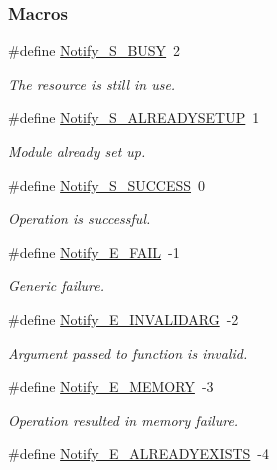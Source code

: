 \subsubsection*{Macros}
\begin{DoxyCompactItemize}
\item 
\#define \hyperlink{_notify_8h_a0d58ddfdb5d08f6ca1de749701033450}{Notify\-\_\-\-S\-\_\-\-B\-U\-S\-Y}~2
\begin{DoxyCompactList}\small\item\em The resource is still in use. \end{DoxyCompactList}\item 
\#define \hyperlink{_notify_8h_a4a3b8a694b528547f8478d0b9e24289c}{Notify\-\_\-\-S\-\_\-\-A\-L\-R\-E\-A\-D\-Y\-S\-E\-T\-U\-P}~1
\begin{DoxyCompactList}\small\item\em Module already set up. \end{DoxyCompactList}\item 
\#define \hyperlink{_notify_8h_a846ddddd026310bcbcda9837a3571ba4}{Notify\-\_\-\-S\-\_\-\-S\-U\-C\-C\-E\-S\-S}~0
\begin{DoxyCompactList}\small\item\em Operation is successful. \end{DoxyCompactList}\item 
\#define \hyperlink{_notify_8h_a20a2a59166c514c653d7eed49344566e}{Notify\-\_\-\-E\-\_\-\-F\-A\-I\-L}~-\/1
\begin{DoxyCompactList}\small\item\em Generic failure. \end{DoxyCompactList}\item 
\#define \hyperlink{_notify_8h_a31fc3f7c99af3b98e9fd9f666cc4e2f3}{Notify\-\_\-\-E\-\_\-\-I\-N\-V\-A\-L\-I\-D\-A\-R\-G}~-\/2
\begin{DoxyCompactList}\small\item\em Argument passed to function is invalid. \end{DoxyCompactList}\item 
\#define \hyperlink{_notify_8h_aa74af2d630f14ab3083a587ef0337184}{Notify\-\_\-\-E\-\_\-\-M\-E\-M\-O\-R\-Y}~-\/3
\begin{DoxyCompactList}\small\item\em Operation resulted in memory failure. \end{DoxyCompactList}\item 
\#define \hyperlink{_notify_8h_aea5c89c302ce37850d8819c85e29ce97}{Notify\-\_\-\-E\-\_\-\-A\-L\-R\-E\-A\-D\-Y\-E\-X\-I\-S\-T\-S}~-\/4

\end{DoxyCompactItemize}
